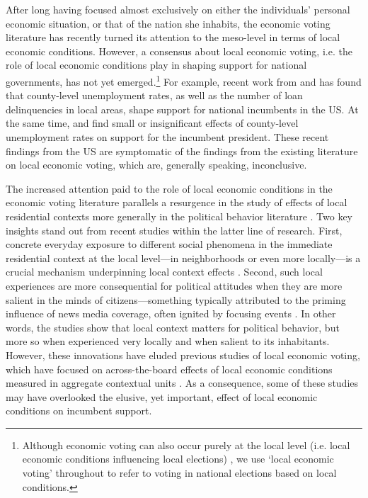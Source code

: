 \documentclass[12pt,a4paper]{article}
\begin{document}
	After long having focused almost exclusively on either the individuals’ personal economic situation, or that of the nation she inhabits, the economic voting literature has recently turned its attention to the meso-level in terms of local economic conditions. However, a consensus about local economic voting, i.e. the role of local economic conditions play in shaping support for national governments, has not yet emerged.\footnote{Although economic voting can also occur purely at the local level (i.e. local economic conditions influencing local elections) \cite[cf.][]{hopkins2017retrospective, burnett2017politics}, we use `local economic voting’ throughout to refer to voting in national elections based on local conditions.} For example, recent work from \cite{hansford2015reevaluating} and \cite{healy2017presidential} has found that county-level unemployment rates, as well as the number of loan delinquencies in local areas, shape support for national incumbents in the US. At the same time, \cite{hill2010economic} and \cite{wright2012unemployment} find small or insignificant effects of county-level unemployment rates on support for the incumbent president. These recent findings from the US are symptomatic of the findings from the existing literature on local economic voting, which are, generally speaking, inconclusive.
	
	The increased attention paid to the role of local economic conditions in the economic voting literature parallels a resurgence in the study of effects of local residential contexts more generally in the political behavior literature \cite[e.g.,][]{hopkins2010politicized,enos2016demolition}. Two key insights stand out from recent studies within the latter line of research. First, concrete everyday exposure to different social phenomena in the immediate residential context at the local level—in neighborhoods or even more locally—is a crucial mechanism underpinning local context effects \citep{moore2017defining,dinesen2015ethnic,enos2016demolition,hjorth2017influence}. Second, such local experiences are more consequential for political attitudes when they are more salient in the minds of citizens—something typically attributed to the priming influence of news media coverage, often ignited by focusing events \citep{hopkins2010politicized,legewie2013terrorist, davenport2015policy}. In other words, the studies show that local context matters for political behavior, but more so when experienced very locally and when salient to its inhabitants. However, these innovations have eluded previous studies of local economic voting, which have focused on across-the-board effects of local economic conditions measured in aggregate contextual units \citep[although see][]{bisgaard2016reconsidering,healy2017presidential}. As a consequence, some of these studies may have overlooked the elusive, yet important, effect of local economic conditions on incumbent support. 
	
\end{document}

